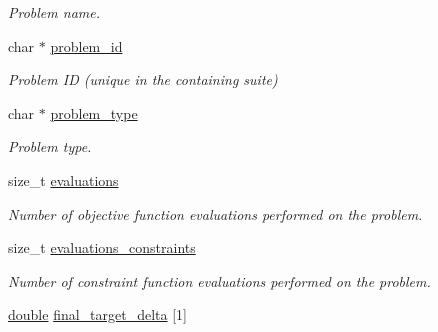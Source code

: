 \begin{DoxyCompactItemize}
\begin{DoxyCompactList}\small\item\em Problem name. \end{DoxyCompactList}\item 
char $\ast$ \hyperlink{structcoco__problem__s_a9f6de79a0e0fb3e5db9ff742295971f7}{problem\+\_\+id}\hypertarget{structcoco__problem__s_a9f6de79a0e0fb3e5db9ff742295971f7}{}\label{structcoco__problem__s_a9f6de79a0e0fb3e5db9ff742295971f7}

\begin{DoxyCompactList}\small\item\em Problem ID (unique in the containing suite) \end{DoxyCompactList}\item 
char $\ast$ \hyperlink{structcoco__problem__s_a3f5bb169e01decb2a4ceff87e49732a8}{problem\+\_\+type}\hypertarget{structcoco__problem__s_a3f5bb169e01decb2a4ceff87e49732a8}{}\label{structcoco__problem__s_a3f5bb169e01decb2a4ceff87e49732a8}

\begin{DoxyCompactList}\small\item\em Problem type. \end{DoxyCompactList}\item 
size\+\_\+t \hyperlink{structcoco__problem__s_aed74da3415da5eaa39f22ceca0aa32e7}{evaluations}\hypertarget{structcoco__problem__s_aed74da3415da5eaa39f22ceca0aa32e7}{}\label{structcoco__problem__s_aed74da3415da5eaa39f22ceca0aa32e7}

\begin{DoxyCompactList}\small\item\em Number of objective function evaluations performed on the problem. \end{DoxyCompactList}\item 
size\+\_\+t \hyperlink{structcoco__problem__s_ada0078e1b8f0ea97aa9fe3b879853a5c}{evaluations\+\_\+constraints}\hypertarget{structcoco__problem__s_ada0078e1b8f0ea97aa9fe3b879853a5c}{}\label{structcoco__problem__s_ada0078e1b8f0ea97aa9fe3b879853a5c}

\begin{DoxyCompactList}\small\item\em Number of constraint function evaluations performed on the problem. \end{DoxyCompactList}\item 
\hyperlink{classdouble}{double} \hyperlink{structcoco__problem__s_ad6e44a22d8c396246622a49e940e4905}{final\+\_\+target\+\_\+delta} \mbox{[}1\mbox{]}\hypertarget{structcoco__problem__s_ad6e44a22d8c396246622a49e940e4905}{}\label{structcoco__problem__s_ad6e44a22d8c396246622a49e940e4905}


\end{DoxyCompactItemize}
